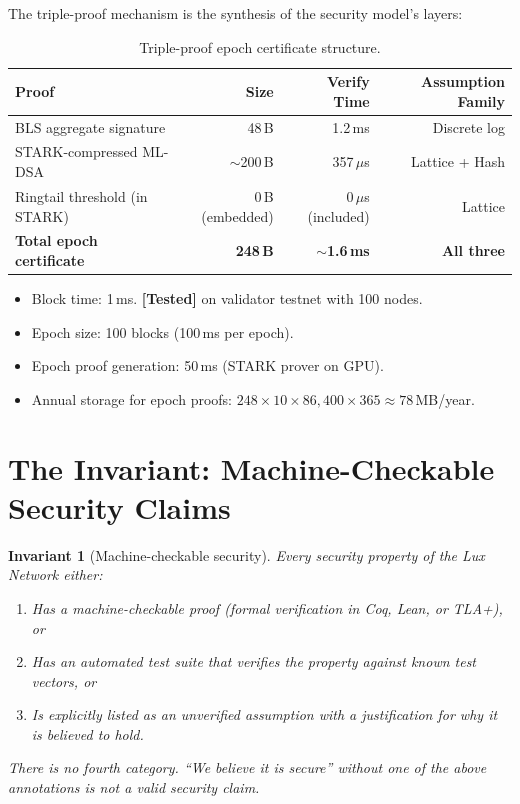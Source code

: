 \documentclass[11pt,a4paper]{article}
\newtheorem{invariant}{Invariant}[section]
\begin{document}
The triple-proof mechanism is the synthesis of the security model's layers:

\begin{table}[ht]
\centering
\caption{Triple-proof epoch certificate structure.}
\label{tab:triple-proof}
\begin{tabular}{lrrr}
\toprule
\textbf{Proof} & \textbf{Size} & \textbf{Verify Time} & \textbf{Assumption Family} \\
\midrule
BLS aggregate signature & 48\,B & 1.2\,ms & Discrete log \\
STARK-compressed ML-DSA & $\sim$200\,B & 357\,$\mu$s & Lattice + Hash \\
Ringtail threshold (in STARK) & 0\,B (embedded) & 0\,$\mu$s (included) & Lattice \\
\midrule
\textbf{Total epoch certificate} & \textbf{248\,B} & \textbf{$\sim$1.6\,ms} & \textbf{All three} \\
\bottomrule
\end{tabular}
\end{table}

\begin{itemize}[leftmargin=2em]
  \item Block time: 1\,ms. \textbf{[Tested]} on validator testnet with 100 nodes.
  \item Epoch size: 100 blocks (100\,ms per epoch).
  \item Epoch proof generation: 50\,ms (STARK prover on GPU).
  \item Annual storage for epoch proofs: $248 \times 10 \times 86{,}400 \times 365
        \approx 78$\,MB/year.
\end{itemize}

\section{The Invariant: Machine-Checkable Security Claims}
\label{sec:invariant}

\begin{invariant}[Machine-checkable security]
Every security property of the Lux Network either:
\begin{enumerate}[leftmargin=2em]
  \item Has a machine-checkable proof (formal verification in Coq, Lean, or TLA+), or
  \item Has an automated test suite that verifies the property against known test
        vectors, or
  \item Is explicitly listed as an unverified assumption with a justification for
        why it is believed to hold.
\end{enumerate}
There is no fourth category. ``We believe it is secure'' without one of the above
annotations is not a valid security claim.
\end{invariant}
\end{document}
